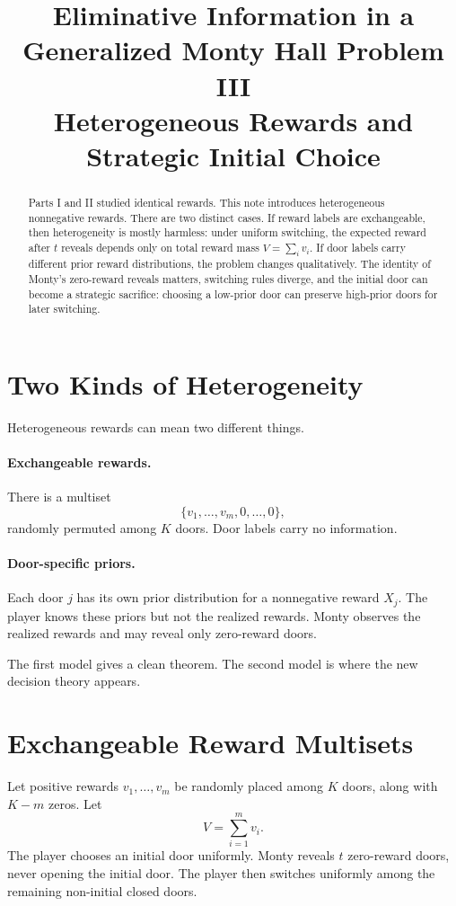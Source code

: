 \documentclass[11pt]{article}
\title{\textbf{Eliminative Information in a Generalized Monty Hall Problem III}\\
\large Heterogeneous Rewards and Strategic Initial Choice}
\author{}
\date{}
\begin{document}
\maketitle

\begin{abstract}
Parts I and II studied identical rewards.  This note introduces heterogeneous
nonnegative rewards.  There are two distinct cases.  If reward labels are
exchangeable, then heterogeneity is mostly harmless: under uniform switching,
the expected reward after $t$ reveals depends only on total reward mass
$V=\sum_i v_i$.  If door labels carry different prior reward distributions,
the problem changes qualitatively.  The identity of Monty's zero-reward
reveals matters, switching rules diverge, and the initial door can become a
strategic sacrifice: choosing a low-prior door can preserve high-prior doors
for later switching.
\end{abstract}

\section{Two Kinds of Heterogeneity}

Heterogeneous rewards can mean two different things.

\paragraph{Exchangeable rewards.}
There is a multiset
\[
  \{v_1,\dots,v_m,0,\dots,0\},
\]
randomly permuted among $K$ doors.  Door labels carry no information.

\paragraph{Door-specific priors.}
Each door $j$ has its own prior distribution for a nonnegative reward $X_j$.
The player knows these priors but not the realized rewards.  Monty observes
the realized rewards and may reveal only zero-reward doors.

The first model gives a clean theorem.  The second model is where the new
decision theory appears.

\section{Exchangeable Reward Multisets}

Let positive rewards $v_1,\dots,v_m$ be randomly placed among $K$ doors, along
with $K-m$ zeros.  Let
\[
  V=\sum_{i=1}^m v_i.
\]
The player chooses an initial door uniformly.  Monty reveals $t$ zero-reward
doors, never opening the initial door.  The player then switches uniformly
among the remaining non-initial closed doors.
\end{document}
